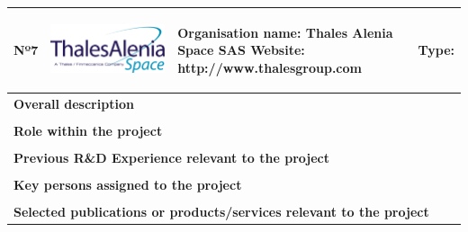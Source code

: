\begin{longtable}[H]{|p{0.7cm}|p{4cm}|p{7cm}|p{1.3cm}|}
	\hline
	\begin{center} Nº7 \end{center} & \begin{center} \includegraphics[scale=0.25]{./logos/Thales_Alenia_Space_Belgium_logo} \end{center} & \begin{center} \textbf{Organisation name:} Thales Alenia Space SAS \newline \textbf{Website:} http://www.thalesgroup.com \end{center} & \begin{center} Type: \end{center} \\ \hline
	
	\multicolumn{4}{|p{13cm}|}{\textbf{Overall description}}  \\ \hline
	
	\multicolumn{4}{|p{13cm}|}{}  \\ \hline
	
	\multicolumn{4}{|p{13cm}|}{\textbf{Role within the project}}   \\ \hline
	
	\multicolumn{4}{|p{13cm}|}{}  \\ \hline
	
	\multicolumn{4}{|p{13cm}|}{\textbf{Previous R\&D Experience relevant to the project}}  \\ \hline
	
	\multicolumn{4}{|p{13cm}|}{}  \\ \hline
	
	\multicolumn{4}{|p{13cm}|}{\textbf{Key persons assigned to the project}}   \\ \hline
	
	\multicolumn{4}{|p{13cm}|}{}  \\ \hline
	
	\multicolumn{4}{|p{13cm}|}{\textbf{Selected publications or products/services relevant to the project}}  \\ \hline
	

\end{longtable}
